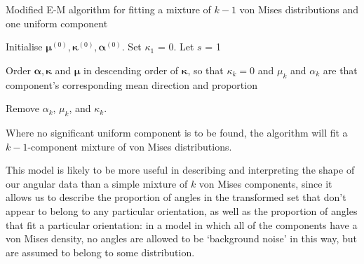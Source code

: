 \documentclass[../../ArchStats.tex]{subfiles}
\begin{document}
\begin{algorithm}[h!]
    \caption{Modified E-M algorithm for fitting a mixture of $k-1$ von Mises distributions and one uniform component}
	\label{alg:EM-modified}



Initialise $\boldsymbol{\mu}^{(0)}, \boldsymbol{\kappa}^{(0)}, \boldsymbol{\alpha}^{(0)}$. Set $\kappa_1$ = 0. Let $s$ = 1\;


Order $\boldsymbol{\alpha}, \boldsymbol{\kappa}$ and $\boldsymbol{\mu}$ in descending order of $\boldsymbol{\kappa}$, so that $\kappa_k = 0$ and $\mu_k$ and $\alpha_k$ are that component's corresponding mean direction and proportion\;

Remove $\alpha_k$, $\mu_k$, and $\kappa_k$.
\end{algorithm}

Where no significant uniform component is to be found, the algorithm will fit a $k-1$-component mixture of von Mises distributions.

This model is likely to be more useful in describing and interpreting the shape of our angular data than  a simple mixture of $k$ von Mises components, since it allows us to describe the proportion of angles in the transformed set that don't appear to belong to any particular orientation, as well as the proportion of angles that fit a particular orientation: in a model in which  all of the components have a von Mises density, no angles are allowed to be `background noise' in this way, but are assumed to belong to some distribution. 
\end{document}
